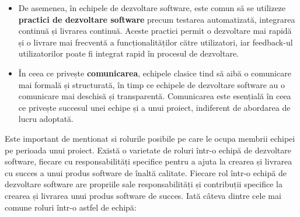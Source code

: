 \documentclass[a4paper, 12pt]{article}
\begin{document}
\begin {itemize}
	\item De asemenea, în echipele de dezvoltare software, este comun să se utilizeze \textbf{practici de dezvoltare software} precum testarea automatizată, integrarea continuă și livrarea continuă. Aceste practici permit o dezvoltare mai rapidă și o livrare mai frecventă a funcționalităților către utilizatori, iar feedback-ul utilizatorilor poate fi integrat rapid în procesul de dezvoltare.

	\item În ceea ce privește \textbf{comunicarea}, echipele clasice tind să aibă o comunicare mai formală și structurată, în timp ce echipele de dezvoltare software au o comunicare mai deschisă și transparentă. Comunicarea este esențială în ceea ce privește succesul unei echipe și a unui proiect, indiferent de abordarea de lucru adoptată.

	\end{itemize}
	

	\quad Este important de mentionat si rolurile posibile pe care le ocupa membrii echipei pe perioada unui proiect. Există o varietate de roluri într-o echipă de dezvoltare software, fiecare cu responsabilități specifice pentru a ajuta la crearea și livrarea cu succes a unui produs software de înaltă calitate. Fiecare rol într-o echipă de dezvoltare software are propriile sale responsabilități și contribuții specifice la crearea și livrarea unui produs software de succes.  Iată câteva dintre cele mai comune roluri într-o astfel de echipă:
\end{document}
